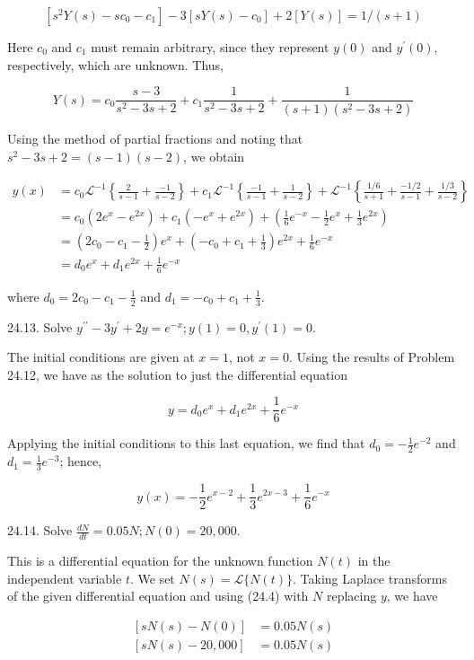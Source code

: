 \documentclass[10pt]{article}
\begin{document}
$$
\left[s^{2} Y(s)-s c_{0}-c_{1}\right]-3\left[s Y(s)-c_{0}\right]+2[Y(s)]=1 /(s+1)
$$

Here $c_{0}$ and $c_{1}$ must remain arbitrary, since they represent $y(0)$ and $y^{\prime}(0)$, respectively, which are unknown. Thus,

$$
Y(s)=c_{0} \frac{s-3}{s^{2}-3 s+2}+c_{1} \frac{1}{s^{2}-3 s+2}+\frac{1}{(s+1)\left(s^{2}-3 s+2\right)}
$$

Using the method of partial fractions and noting that $s^{2}-3 s+2=(s-1)(s-2)$, we obtain

$$
\begin{aligned}
y(x) & =c_{0} \mathscr{L}^{-1}\left\{\frac{2}{s-1}+\frac{-1}{s-2}\right\}+c_{1} \mathscr{L}^{-1}\left\{\frac{-1}{s-1}+\frac{1}{s-2}\right\}+\mathscr{L}^{-1}\left\{\frac{1 / 6}{s+1}+\frac{-1 / 2}{s-1}+\frac{1 / 3}{s-2}\right\} \\
& =c_{0}\left(2 e^{x}-e^{2 x}\right)+c_{1}\left(-e^{x}+e^{2 x}\right)+\left(\frac{1}{6} e^{-x}-\frac{1}{2} e^{x}+\frac{1}{3} e^{2 x}\right) \\
& =\left(2 c_{0}-c_{1}-\frac{1}{2}\right) e^{x}+\left(-c_{0}+c_{1}+\frac{1}{3}\right) e^{2 x}+\frac{1}{6} e^{-x} \\
& =d_{0} e^{x}+d_{1} e^{2 x}+\frac{1}{6} e^{-x}
\end{aligned}
$$

where $d_{0}=2 c_{0}-c_{1}-\frac{1}{2}$ and $d_{1}=-c_{0}+c_{1}+\frac{1}{3}$.

24.13. Solve $y^{\prime \prime}-3 y^{\prime}+2 y=e^{-x} ; y(1)=0, y^{\prime}(1)=0$.

The initial conditions are given at $x=1$, not $x=0$. Using the results of Problem 24.12, we have as the solution to just the differential equation

$$
y=d_{0} e^{x}+d_{1} e^{2 x}+\frac{1}{6} e^{-x}
$$

Applying the initial conditions to this last equation, we find that $d_{0}=-\frac{1}{2} e^{-2}$ and $d_{1}=\frac{1}{3} e^{-3}$; hence,

$$
y(x)=-\frac{1}{2} e^{x-2}+\frac{1}{3} e^{2 x-3}+\frac{1}{6} e^{-x}
$$

24.14. Solve $\frac{d N}{d t}=0.05 N ; N(0)=20,000$.

This is a differential equation for the unknown function $N(t)$ in the independent variable $t$. We set $N(s)=\mathscr{L}\{N(t)\}$. Taking Laplace transforms of the given differential equation and using (24.4) with $N$ replacing $y$, we have

$$
\begin{aligned}
{[s N(s)-N(0)] } & =0.05 N(s) \\
{[s N(s)-20,000] } & =0.05 N(s)
\end{aligned}
$$
\end{document}
